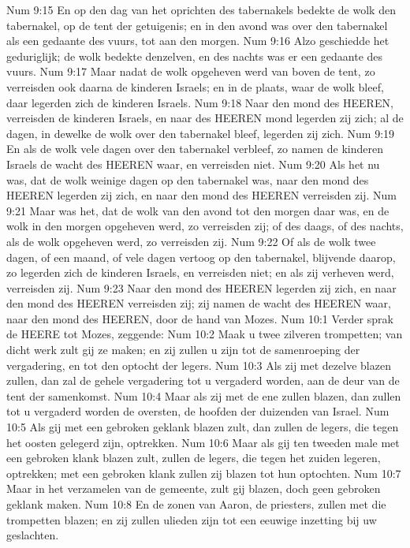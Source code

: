 Num 9:15  En op den dag van het oprichten des tabernakels bedekte de wolk den tabernakel, op de tent der getuigenis; en in den avond was over den tabernakel als een gedaante des vuurs, tot aan den morgen.
Num 9:16  Alzo geschiedde het geduriglijk; de wolk bedekte denzelven, en des nachts was er een gedaante des vuurs.
Num 9:17  Maar nadat de wolk opgeheven werd van boven de tent, zo verreisden ook daarna de kinderen Israels; en in de plaats, waar de wolk bleef, daar legerden zich de kinderen Israels.
Num 9:18  Naar den mond des HEEREN, verreisden de kinderen Israels, en naar des HEEREN mond legerden zij zich; al de dagen, in dewelke de wolk over den tabernakel bleef, legerden zij zich.
Num 9:19  En als de wolk vele dagen over den tabernakel verbleef, zo namen de kinderen Israels de wacht des HEEREN waar, en verreisden niet.
Num 9:20  Als het nu was, dat de wolk weinige dagen op den tabernakel was, naar den mond des HEEREN legerden zij zich, en naar den mond des HEEREN verreisden zij.
Num 9:21  Maar was het, dat de wolk van den avond tot den morgen daar was, en de wolk in den morgen opgeheven werd, zo verreisden zij; of des daags, of des nachts, als de wolk opgeheven werd, zo verreisden zij.
Num 9:22  Of als de wolk twee dagen, of een maand, of vele dagen vertoog op den tabernakel, blijvende daarop, zo legerden zich de kinderen Israels, en verreisden niet; en als zij verheven werd, verreisden zij.
Num 9:23  Naar den mond des HEEREN legerden zij zich, en naar den mond des HEEREN verreisden zij; zij namen de wacht des HEEREN waar, naar den mond des HEEREN, door de hand van Mozes.
Num 10:1  Verder sprak de HEERE tot Mozes, zeggende:
Num 10:2  Maak u twee zilveren trompetten; van dicht werk zult gij ze maken; en zij zullen u zijn tot de samenroeping der vergadering, en tot den optocht der legers.
Num 10:3  Als zij met dezelve blazen zullen, dan zal de gehele vergadering tot u vergaderd worden, aan de deur van de tent der samenkomst.
Num 10:4  Maar als zij met de ene zullen blazen, dan zullen tot u vergaderd worden de oversten, de hoofden der duizenden van Israel.
Num 10:5  Als gij met een gebroken geklank blazen zult, dan zullen de legers, die tegen het oosten gelegerd zijn, optrekken.
Num 10:6  Maar als gij ten tweeden male met een gebroken klank blazen zult, zullen de legers, die tegen het zuiden legeren, optrekken; met een gebroken klank zullen zij blazen tot hun optochten.
Num 10:7  Maar in het verzamelen van de gemeente, zult gij blazen, doch geen gebroken geklank maken.
Num 10:8  En de zonen van Aaron, de priesters, zullen met die trompetten blazen; en zij zullen ulieden zijn tot een eeuwige inzetting bij uw geslachten.
